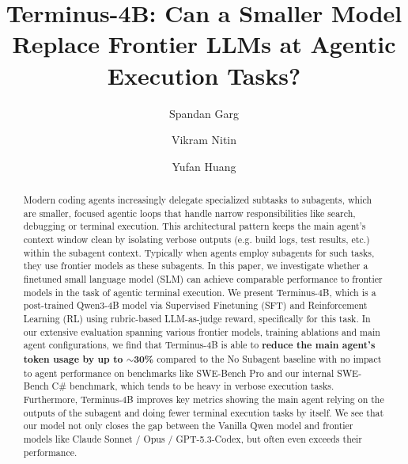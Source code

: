 \documentclass[sigconf,review]{acmart}
\begin{document}
\title[Terminus-4B]{Terminus-4B: Can a Smaller Model Replace Frontier LLMs at Agentic Execution Tasks?}

\author{Spandan Garg}
\author{Vikram Nitin}
\author{Yufan Huang}

\date{}



\begin{abstract}
Modern coding agents increasingly delegate specialized subtasks to subagents, which are smaller, focused agentic loops that handle narrow responsibilities like search, debugging or terminal execution. This architectural pattern keeps the main agent's context window clean by isolating verbose outputs (e.g. build logs, test results, etc.) within the subagent context. Typically when agents employ subagents for such tasks, they use frontier models as these subagents. In this paper, we investigate whether a finetuned small language model (SLM) can achieve comparable performance to frontier models in the task of agentic terminal execution. We present Terminus-4B, which is a post-trained Qwen3-4B model via Supervised Finetuning (SFT) and Reinforcement Learning (RL) using rubric-based LLM-as-judge reward, specifically for this task. In our extensive evaluation spanning various frontier models, training ablations and main agent configurations, we find that Terminus-4B is able to \textbf{reduce the main agent's token usage by up to $\sim$30\%} compared to the No Subagent baseline with no impact to agent performance on benchmarks like SWE-Bench Pro and our internal SWE-Bench C\# benchmark, which tends to be heavy in verbose execution tasks. Furthermore, Terminus-4B improves key metrics showing the main agent relying on the outputs of the subagent and doing fewer terminal execution tasks by itself. We see that our model not only closes the gap between the Vanilla Qwen model and frontier models like Claude Sonnet / Opus / GPT-5.3-Codex, but often even exceeds their performance.

\end{abstract}

\maketitle
\end{document}
